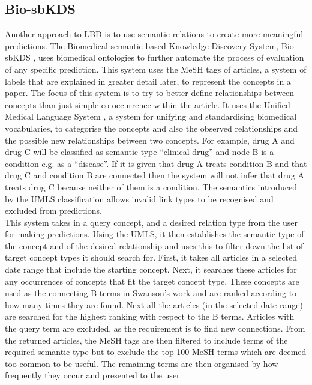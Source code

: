 \documentclass{l4proj}
\begin{document}
\subsection{Bio-sbKDS}

Another approach to LBD is to use semantic relations to create more meaningful predictions. The Biomedical semantic-based Knowledge Discovery System, Bio-sbKDS \citep{hu_semantic-based_2005}, uses biomedical ontologies to further automate the process of evaluation of any specific prediction. This system uses the MeSH tags of articles, a system of labels that are explained in greater detail later, to represent the concepts in a paper. The focus of this system is to try to better define relationships between concepts than just simple co-occurrence within the article. It uses the Unified Medical Language System \citep{umls}, a system for unifying and standardising biomedical vocabularies, to categorise the concepts and also the observed relationships and the possible new relationships between two concepts. For example, drug A  and drug C will be classified as semantic type ``clinical drug'' and node B is a condition e.g. as a  ``disease''. If it is given that drug A treats condition B and that drug C and condition B are connected then the system will not infer that drug A treats drug C because neither of them is a condition. The semantics introduced by the UMLS classification allows invalid link types to be recognised and excluded from predictions. \\

This system takes in a query concept, and a desired relation type from the user for making predictions. Using the UMLS, it then establishes the semantic type of the concept and of the desired relationship and uses this to filter down the list of target concept types it should search for. First, it takes all articles in a selected date range that include the starting concept. Next, it searches these articles for any occurrences of concepts that fit the target concept type. These concepts are used as the connecting B terms in Swanson's work and are ranked according to how many times they are found. Next all the articles (in the selected date range) are searched for the highest ranking with respect to the B terms. Articles with the query term are excluded, as the requirement is to find new connections. From the returned articles, the MeSH tags are then filtered to include terms of the required semantic type but to exclude the top 100 MeSH terms which are deemed too common to be useful. The remaining terms are then organised by how frequently they occur and presented to the user. \\
\end{document}

